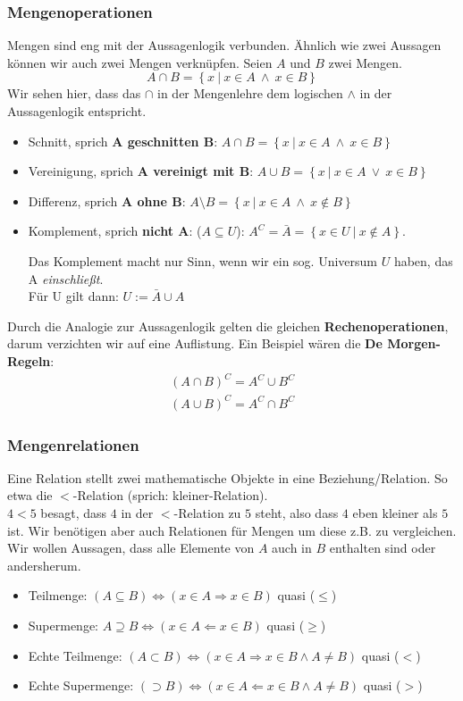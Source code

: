 \subsubsection{Mengenoperationen}
Mengen sind eng mit der Aussagenlogik verbunden. Ähnlich wie zwei Aussagen können wir auch zwei Mengen verknüpfen. Seien $A$ und $B$ zwei Mengen.
\begin{equation*}
A \cap B = \left\{ x \ | \ x \in A \ \land \ x \in B \right\}
\end{equation*}
Wir sehen hier, dass das $\cap$ in der Mengenlehre dem logischen $\land$ in der Aussagenlogik entspricht.
\begin{itemize}
\item Schnitt, sprich \textbf{A geschnitten B}: $A \cap B =  \left\{x \ | \ x \in A \ \land \ x \in B \right\}$
\item Vereinigung, sprich \textbf{A vereinigt mit B}: $A \cup B =  \left\{x \ | \ x \in A \ \lor \ x \in B \right\}$
\item Differenz, sprich \textbf{A ohne B}: $A \setminus B =  \left\{x \ | \ x \in A \ \land \ x \notin B \right\}$
\item Komplement, sprich \textbf{nicht A}: ($A \subseteq U$): $A^C = \bar{A} = \left\{x \in U \ | \ x \notin A \right\}$.
\begin{warning}
	Das Komplement macht nur Sinn, wenn wir ein sog. Universum $U$ haben, das A \textit{einschließt}.\\
	Für U gilt dann: $U := \bar{A} \cup A$
\end{warning}
\end{itemize}
Durch die Analogie zur Aussagenlogik gelten die gleichen \textbf{Rechenoperationen}, darum verzichten wir auf eine Auflistung. Ein Beispiel wären die \textbf{De Morgen-Regeln}:
\begin{gather*}
(A \cap B)^C = A^C \cup B^C \\
(A \cup B)^C = A^C \cap B^C 
\end{gather*} 

\subsubsection{Mengenrelationen}
Eine Relation stellt zwei mathematische Objekte in eine Beziehung/Relation. So etwa die $<$-Relation (sprich: kleiner-Relation).\\
$4 < 5$ besagt, dass $4$ in der $<$-Relation zu $5$ steht, also dass $4$ eben kleiner als $5$ ist. Wir benötigen aber auch Relationen für Mengen um diese z.B. zu vergleichen. Wir wollen Aussagen, dass alle Elemente von $A$ auch in $B$ enthalten sind oder andersherum.
\begin{itemize}
\item Teilmenge: $(A \subseteq B) \iff (x \in A \Rightarrow x \in B)$ quasi ($\leq$)
\item Supermenge: $A \supseteq B  \iff (x \in A \Leftarrow x \in B)$ quasi ($\geq$)
\item Echte Teilmenge: $(A \subset B) \iff (x \in A \Rightarrow x \in B \land A \neq B)$ quasi ($<$)
\item Echte Supermenge: $(\supset B) \iff (x \in A \Leftarrow x \in B \land A \neq B)$ quasi ($>$)
\end{itemize}

